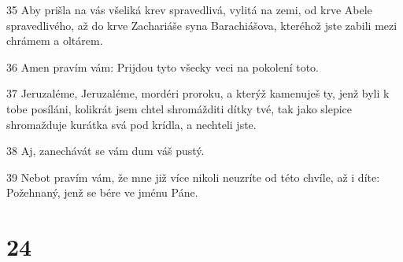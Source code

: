\par 35 Aby prišla na vás všeliká krev spravedlivá, vylitá na zemi, od krve Abele spravedlivého, až do krve Zachariáše syna Barachiášova, kteréhož jste zabili mezi chrámem a oltárem.
\par 36 Amen pravím vám: Prijdou tyto všecky veci na pokolení toto.
\par 37 Jeruzaléme, Jeruzaléme, mordéri proroku, a kterýž kamenuješ ty, jenž byli k tobe posíláni, kolikrát jsem chtel shromážditi dítky tvé, tak jako slepice shromažduje kurátka svá pod krídla, a nechteli jste.
\par 38 Aj, zanechávát se vám dum váš pustý.
\par 39 Nebot pravím vám, že mne již více nikoli neuzríte od této chvíle, až i díte: Požehnaný, jenž se bére ve jménu Páne.

\chapter{24}

